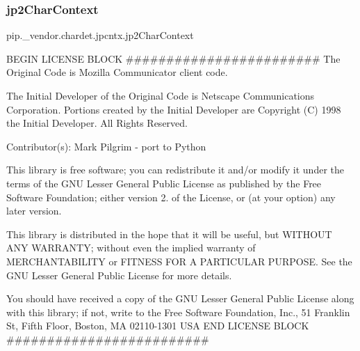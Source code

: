 \subsubsection{\texorpdfstring{jp2\+Char\+Context}{jp2CharContext}}
{\footnotesize\ttfamily pip.\+\_\+vendor.\+chardet.\+jpcntx.\+jp2\+Char\+Context}



B\+E\+G\+IN L\+I\+C\+E\+N\+SE B\+L\+O\+CK \#\#\#\#\#\#\#\#\#\#\#\#\#\#\#\#\#\#\#\#\#\#\#\# The Original Code is Mozilla Communicator client code. 

The Initial Developer of the Original Code is Netscape Communications Corporation. Portions created by the Initial Developer are Copyright (C) 1998 the Initial Developer. All Rights Reserved.

Contributor(s)\+: Mark Pilgrim -\/ port to Python

This library is free software; you can redistribute it and/or modify it under the terms of the G\+NU Lesser General Public License as published by the Free Software Foundation; either version 2. of the License, or (at your option) any later version.

This library is distributed in the hope that it will be useful, but W\+I\+T\+H\+O\+UT A\+NY W\+A\+R\+R\+A\+N\+TY; without even the implied warranty of M\+E\+R\+C\+H\+A\+N\+T\+A\+B\+I\+L\+I\+TY or F\+I\+T\+N\+E\+SS F\+OR A P\+A\+R\+T\+I\+C\+U\+L\+AR P\+U\+R\+P\+O\+SE. See the G\+NU Lesser General Public License for more details.

You should have received a copy of the G\+NU Lesser General Public License along with this library; if not, write to the Free Software Foundation, Inc., 51 Franklin St, Fifth Floor, Boston, MA 02110-\/1301 U\+SA E\+ND L\+I\+C\+E\+N\+SE B\+L\+O\+CK \#\#\#\#\#\#\#\#\#\#\#\#\#\#\#\#\#\#\#\#\#\#\#\#\# 